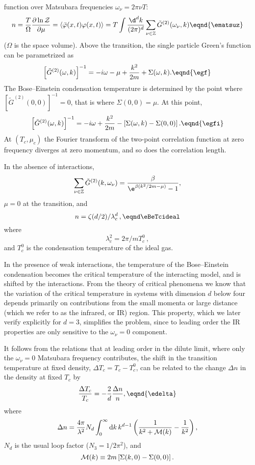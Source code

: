 function over Matsubara frequencies $\omega_\nu=2\pi \nu T$:
$$
n = {T\over \Omega } {\partial \ln {\cal Z}\over \partial \mu}=
\left<\bar\varphi(x,t) \varphi(x,t)\right>=
T\int\lfrac{\d^d k}{(2\pi)^d} \sum_{\nu\in{\Bbb Z}} \tilde G^{(2)}( \omega_\nu,k)\eqnd{\ematsuz}
$$
($\Omega $ is the space volume).
Above the transition, the single particle  Green's function  can
be parametrized as
$$
\left[\tilde G^{(2)}( \omega ,k)\right]^{-1} =- i\omega  - \mu + \lfrac{k^2}{2m}+ \Sigma( \omega ,k).
\eqnd{\egf}
$$
The Bose--Einstein condensation temperature is determined by the point where $ [\tilde G^{(2)}(0, 0)]^{-1}=0$, that is where $\Sigma(0,0) = \mu$.  At this point,
$$
\left[\tilde G^{(2)}( \omega,k )\right]^{-1}  =-i \omega +\lfrac{k^2}{2m} - \left[\Sigma( \omega,k )-\Sigma(0,0)\right].
\eqnd{\egfi}
$$
At $(T_c,\mu_c)$ the Fourier transform of the two-point correlation
function at zero frequency diverges at zero momentum, and so does the correlation length. \par
In the absence of interactions,
$$
 \sum_{\nu\in{\Bbb Z}} \tilde G^{(2)}(k,\omega_\nu) ={\beta \over
\e^{\beta (k^2/2m-\mu)}-1}, $$
$\mu=0$ at the transition, and
$$ n=\zeta(d/2)/\lambda_c^d\, , \eqnd\eBeTcideal
$$
where
$$\lambda_c^2=2\pi/mT_c^0\,,$$
 and $T_c^0$ is the condensation temperature of the ideal gas.

In the presence of weak interactions, the temperature of the Bose--Einstein
condensation becomes the critical temperature of the interacting model, and is
shifted by the interactions. From the theory of critical phenomena we know
that the variation of the critical temperature in systems with dimension $d$
below four depends primarily on contributions from the small momenta or large
distance (which we refer to as the infrared, or IR) region.  This property,
which we later verify explicitly for $d=3$, simplifies the problem, since to
leading order the IR properties are only sensitive to the $\omega_\nu=0$ component.

It follows from the relations \eqns{\egfi,\eBeTcideal} that at leading order in the dilute limit, where only the
$\omega_\nu=0$ Matsubara frequency contributes, the shift in the transition
temperature at fixed density, $\Delta T_c = T_c - T_c^0$, can be related to
the change $\Delta n$ in the density at fixed $T_c$ by 
$$ \lfrac{\Delta T_c}{T_c} =-\lfrac{2}{d}\lfrac{\Delta n}{n},\eqnd{\edelta}
$$
where
$$
\Delta n={4\pi \over\lambda^2}N_d \int_0^\infty {\rm d}k\,
k^{d-1}\left({\displaystyle{1\over k^2+{\cal M}(k)}}-{\displaystyle{1\over k^2}}\right),
$$
$N_d$ is the usual loop factor  ($N_3=1/2\pi^2$), and
$$
{\cal M}(k)\equiv 2m\left[\Sigma(k,0)-\Sigma(0,0)\right].
$$

